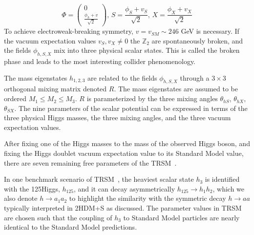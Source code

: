 \begin{equation}
    \Phi = \begin{pmatrix} 0 \\ \frac{\phi_h + v}{\sqrt{2}} \end{pmatrix}, 
    \,
    S = \frac{\phi_S + v_S}{\sqrt{2}} ,
    \,
    X = \frac{\phi_X + v_X}{\sqrt{2}}
\end{equation}
To achieve electroweak-breaking symmetry, $v  = v_{SM} \sim 246$ GeV is necessary. If the vacuum expectation values $v_S, v_X \neq 0$ the $\mathbb{Z}_2$ are spontaneously broken, and the fields $\phi_{h,S,X}$ mix into three physical scalar states. This is called the broken phase and leads to the most interesting collider phenomenology.

The mass eigenstates $h_{1,2,3}$ are related to the fields $\phi_{h,S,X}$ through a $3\times 3$ orthogonal mixing matrix denoted $R$. The mass eigenstates are assumed to be ordered $M_1 \leq M_2 \leq M_3$. $R$ is parameterized by the three mixing angles $\theta_{hS}$, $\theta_{hX}$, $\theta_{SX}$. The nine parameters of the scalar potential can be expressed in terms of the three physical Higgs masses, the three mixing angles, and the three vacuum expectation values. 

After fixing one of the Higgs masses to the mass of the observed Higgs boson, and fixing the Higgs doublet vacuum expectation value to its Standard Model value, there are seven remaining free parameters of the TRSM~\cite{Robens:2019kga}.

In one benchmark scenario of TRSM~\cite{Robens:2019kga}, the heaviest scalar state $h_3$ is identified with the 125\GeV Higgs, $h_{125}$, and it can decay asymmetrically $h_{125} \rightarrow h_1 h_2$, which we also denote $h \rightarrow a_1 a_2$ to highlight the similarity with the symmetric decay $h \rightarrow aa$ typically interpreted in 2HDM+S as discussed. The parameter values in TRSM are chosen such that the coupling of $h_3$ to Standard Model particles are nearly identical to the Standard Model predictions. 

